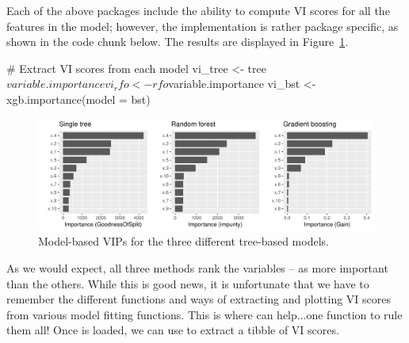 
Each of the above packages include the ability to compute VI scores for all the features in the model; however, the implementation is rather package specific, as shown in the code chunk below. The results are displayed in Figure~\ref{fig:vi-plots}.

\begin{example}
# Extract VI scores from each model
vi_tree <- tree$variable.importance
vi_rfo <- rfo$variable.importance
vi_bst <- xgb.importance(model = bst)
\end{example}

\begin{figure}[!htb]
  \centering 
  \includegraphics[width=1\linewidth]{figures/vi-plots} 
  \caption{Model-based VIPs for the three different tree-based models.}
  \label{fig:vi-plots}
\end{figure}

As we would expect, all three methods rank the variables -- as more important than the others. While this is good news, it is unfortunate that we have to remember the different functions and ways of extracting and plotting VI scores from various model fitting functions. This is where  \citep{vip-pkg} can help...one function to rule them all! Once  is loaded, we can use  to extract a tibble of VI scores.

